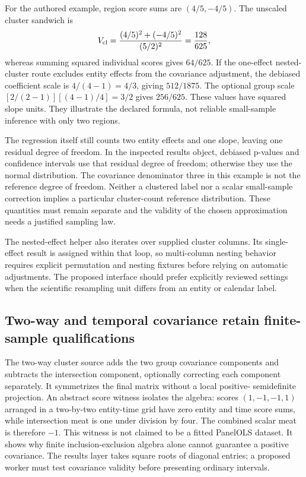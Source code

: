 For the authored example, region score sums are $(4/5,-4/5)$. The unscaled
cluster sandwich is
\[
 V_{\rm cl}=\frac{(4/5)^2+(-4/5)^2}{(5/2)^2}
             =\frac{128}{625},
\]
whereas summing squared individual scores gives $64/625$. If the one-effect
nested-cluster route excludes entity effects from the covariance adjustment,
the debiased coefficient scale is $4/(4-1)=4/3$, giving $512/1875$.
The optional group scale $[2/(2-1)][(4-1)/4]=3/2$ gives $256/625$.
These values have squared slope units. They illustrate the declared
formula, not reliable small-sample inference with only two regions.
\citep{exec24_lmpanel_reference}

The regression itself still counts two entity effects and one slope, leaving
one residual degree of freedom. In the inspected results object, debiased
p-values and confidence intervals use that residual degree of freedom;
otherwise they use the normal distribution. The covariance denominator
three in this example is not the reference degree of freedom. Neither a
clustered label nor a scalar small-sample correction implies a particular
cluster-count reference distribution. These quantities must remain separate
and the validity of the chosen approximation needs a justified sampling law.
\citep{exec24_lmpanel_source,exec24_lmpanel_reference}

The nested-effect helper also iterates over supplied cluster columns.
Its single-effect result is assigned within that loop, so multi-column
nesting behavior requires explicit permutation and nesting fixtures before
relying on automatic adjustments. The proposed interface should prefer
explicitly reviewed settings when the scientific resampling unit differs
from an entity or calendar label.~\citep{exec24_lmpanel_source,exec24_lmpanel_reference}

\subsection{Two-way and temporal covariance retain finite-sample qualifications}
The two-way cluster source adds the two group covariance components and
subtracts the intersection component, optionally correcting each component
separately. It symmetrizes the final matrix without a local positive-
semidefinite projection. An abstract score witness isolates the algebra:
scores $(1,-1,-1,1)$ arranged in a two-by-two entity-time grid have zero
entity and time score sums, while intersection meat is one under division
by four. The combined scalar meat is therefore $-1$. This witness is not
claimed to be a fitted PanelOLS dataset. It shows why finite
inclusion-exclusion algebra alone cannot guarantee a positive covariance.
The results layer takes square roots of diagonal entries; a proposed worker
must test covariance validity before presenting ordinary intervals.
\citep{exec24_lmpanel_source,exec24_lmpanel_reference}

